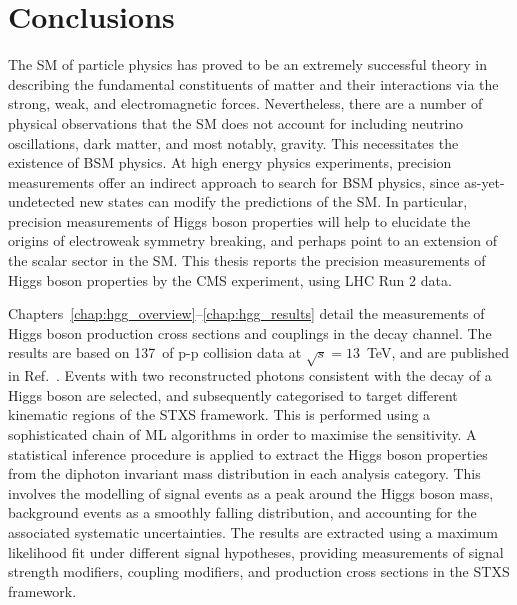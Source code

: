 \chapter{Conclusions}
\label{chap:conclusions}

The SM of particle physics has proved to be an extremely successful theory in describing the fundamental constituents of matter and their interactions via the strong, weak, and electromagnetic forces. Nevertheless, there are a number of physical observations that the SM does not account for including neutrino oscillations, dark matter, and most notably, gravity. This necessitates the existence of BSM physics. At high energy physics experiments, precision measurements offer an indirect approach to search for BSM physics, since as-yet-undetected new states can modify the predictions of the SM. In particular, precision measurements of Higgs boson properties will help to elucidate the origins of electroweak symmetry breaking, and perhaps point to an extension of the scalar sector in the SM.  This thesis reports the precision measurements of Higgs boson properties by the CMS experiment, using LHC Run 2 data.

Chapters~\ref{chap:hgg_overview}--\ref{chap:hgg_results} detail the measurements of Higgs boson production cross sections and couplings in the \Hgg decay channel. The results are based on 137~\fbinv of p-p collision data at $\sqrt{s}=13$~TeV, and are published in Ref.~\cite{Sirunyan:2021ybb}. Events with two reconstructed photons consistent with the decay of a Higgs boson are selected, and subsequently categorised to target different kinematic regions of the STXS framework. This is performed using a sophisticated chain of ML algorithms in order to maximise the sensitivity. A statistical inference procedure is applied to extract the Higgs boson properties from the diphoton invariant mass distribution in each analysis category. This involves the modelling of signal events as a peak around the Higgs boson mass, background events as a smoothly falling distribution, and accounting for the associated systematic uncertainties. The results are extracted using a maximum likelihood fit under different signal hypotheses, providing measurements of signal strength modifiers, coupling modifiers, and production cross sections in the STXS framework.

